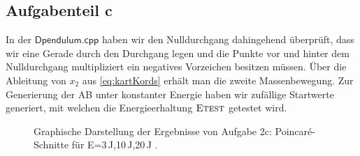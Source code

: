\subsection*{Aufgabenteil c}
In der $\textsf{Dpendulum.cpp}$ haben wir den Nulldurchgang dahingehend überprüft, dass wir eine Gerade durch den Durchgang legen und die Punkte vor und hinter dem Nulldurchgang multipliziert ein negatives Vorzeichen besitzen müssen. Über die Ableitung von $x_2$ aus \ref{eq:kartKords} erhält man die zweite Massenbewegung. 
Zur Generierung der AB unter konstanter Energie haben wir zufällige Startwerte generiert, mit welchen die Energieerhaltung $\textsc{Etest}$ getestet wird. 
\begin{landscape}
	\begin{figure}
		\caption{Graphische Darstellung der Ergebnisse von Aufgabe 2c: Poincar\'{e}-Schnitte für E=3$\,$J,10$\,$J,20$\,$J .}
		\label{fig:OsziC1}
	\end{figure}
\end{landscape} 


